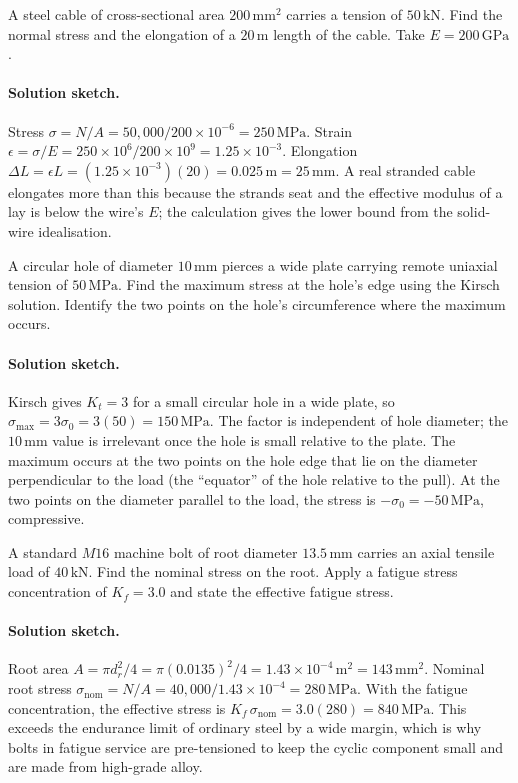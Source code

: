 \begin{exercise}
A steel cable of cross-sectional area $200\,\si{\milli\meter}^2$
carries a tension of $50\,\text{kN}$. Find the normal stress and the
elongation of a $20\,\si{\meter}$ length of the cable. Take $E =
200\,\text{GPa}$.
\paragraph{Solution sketch.} Stress $\sigma = N/A = 50{,}000/200\times
10^{-6} = 250\,\text{MPa}$. Strain $\epsilon = \sigma/E = 250\times 10^6
/200\times 10^9 = 1.25\times 10^{-3}$. Elongation $\Delta L = \epsilon L
= (1.25\times 10^{-3})(20) = 0.025\,\si{\meter} = 25\,\si{\milli\meter}$.
A real stranded cable elongates more than this because the strands seat
and the effective modulus of a lay is below the wire's $E$; the
calculation gives the lower bound from the solid-wire idealisation.
\end{exercise}

\begin{exercise}
A circular hole of diameter $10\,\si{\milli\meter}$ pierces a wide
plate carrying remote uniaxial tension of $50\,\text{MPa}$. Find the
maximum stress at the hole's edge using the Kirsch solution.
Identify the two points on the hole's circumference where the
maximum occurs.
\paragraph{Solution sketch.} Kirsch gives $K_t = 3$ for a small
circular hole in a wide plate, so $\sigma_{\max} = 3\sigma_0 = 3(50) =
150\,\text{MPa}$. The factor is independent of hole diameter; the
$10\,\si{\milli\meter}$ value is irrelevant once the hole is small
relative to the plate. The maximum occurs at the two points on the
hole edge that lie on the diameter perpendicular to the load (the
``equator'' of the hole relative to the pull). At the two points on the
diameter parallel to the load, the stress is $-\sigma_0 = -50\,\text{MPa}$,
compressive.
\end{exercise}

\begin{exercise}
A standard $M16$ machine bolt of root diameter $13.5\,\si{\milli
\meter}$ carries an axial tensile load of $40\,\text{kN}$. Find the
nominal stress on the root. Apply a fatigue stress concentration of
$K_f = 3.0$ and state the effective fatigue stress.
\paragraph{Solution sketch.} Root area $A = \pi d_r^2/4 =
\pi(0.0135)^2/4 = 1.43\times 10^{-4}\,\si{\meter}^2 = 143\,\si{\milli
\meter}^2$. Nominal root stress $\sigma_{\text{nom}} = N/A = 40{,}000/
1.43\times 10^{-4} = 280\,\text{MPa}$. With the fatigue concentration,
the effective stress is $K_f\,\sigma_{\text{nom}} = 3.0(280) = 840\,
\text{MPa}$. This exceeds the endurance limit of ordinary steel by a
wide margin, which is why bolts in fatigue service are pre-tensioned to
keep the cyclic component small and are made from high-grade alloy.
\end{exercise}

